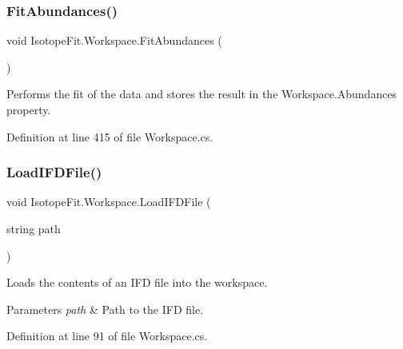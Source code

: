 \subsubsection{\texorpdfstring{Fit\+Abundances()}{FitAbundances()}}
{\footnotesize\ttfamily void Isotope\+Fit.\+Workspace.\+Fit\+Abundances (\begin{DoxyParamCaption}{ }\end{DoxyParamCaption})}



Performs the fit of the data and stores the result in the Workspace.\+Abundances property. 



Definition at line 415 of file Workspace.\+cs.

\mbox{\label{class_isotope_fit_1_1_workspace_a55061c1f05d3e02d2d591fe6211d2f1f}} 
\subsubsection{\texorpdfstring{Load\+I\+F\+D\+File()}{LoadIFDFile()}}
{\footnotesize\ttfamily void Isotope\+Fit.\+Workspace.\+Load\+I\+F\+D\+File (\begin{DoxyParamCaption}\item[{string}]{path }\end{DoxyParamCaption})}



Loads the contents of an I\+FD file into the workspace. 


\begin{DoxyParams}{Parameters}
{\em path} & Path to the I\+FD file.\\
\hline
\end{DoxyParams}


Definition at line 91 of file Workspace.\+cs.

\mbox{\label{class_isotope_fit_1_1_workspace_a00c1ae2e3b1d443808bef150a1e99410}} 
